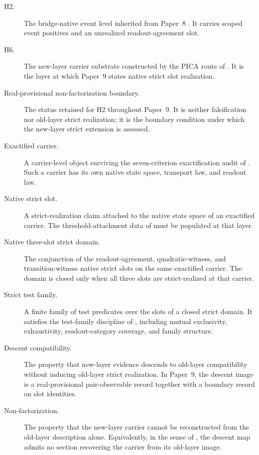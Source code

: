 \documentclass[11pt]{article}
\newcommand{\OldLayer}{H2}
\newcommand{\NewLayer}{H6}
\newcommand{\PaperNine}{Paper~9}
\newcommand{\PaperEight}{Paper~8}
\theoremstyle{definition}
\begin{document}
\begin{description}
\item[\OldLayer{}.]
The bridge-native event level inherited from \PaperEight{}
\cite{Tsiokos2026CarrierToEvent}.  It carries scoped event positives and an
unrealized readout-agreement slot.

\item[\NewLayer{}.]
The new-layer carrier substrate constructed by the PICA route of
.  It is the layer at which \PaperNine{} states native strict
slot realization.

\item[Real-provisional non-factorization boundary.]
The status retained for \OldLayer{} throughout \PaperNine{}.  It is neither
falsification nor old-layer strict realization; it is the boundary condition
under which the new-layer strict extension is assessed.

\item[Exactified carrier.]
A carrier-level object surviving the seven-criterion exactification audit of
\cite{Tsiokos2026CarrierExactification}.  Such a carrier has its own native
state space, transport law, and readout law.

\item[Native strict slot.]
A strict-realization claim attached to the native state space of an exactified
carrier.  The threshold-attachment data of
\cite{Tsiokos2026FoundationsII} must be populated at that layer.

\item[Native three-slot strict domain.]
The conjunction of the readout-agreement, quadratic-witness, and
transition-witness native strict slots on the same exactified carrier.  The
domain is closed only when all three slots are strict-realized at that carrier.

\item[Strict test family.]
A finite family of test predicates over the slots of a closed strict domain.
It satisfies the test-family discipline of
\cite{Tsiokos2026CarrierToEvent}, including mutual exclusivity, exhaustivity,
readout-category coverage, and family structure.

\item[Descent compatibility.]
The property that new-layer evidence descends to old-layer compatibility
without inducing old-layer strict realization.  In \PaperNine{}, the descent
image is a real-provisional pair-observable record together with a boundary
record on slot identities.

\item[Non-factorization.]
The property that the new-layer carrier cannot be reconstructed from the
old-layer description alone.  Equivalently, in the sense of
\cite{Tsiokos2026FoundationsII}, the descent map admits no section recovering
the carrier from its old-layer image.
\end{description}
\end{document}

